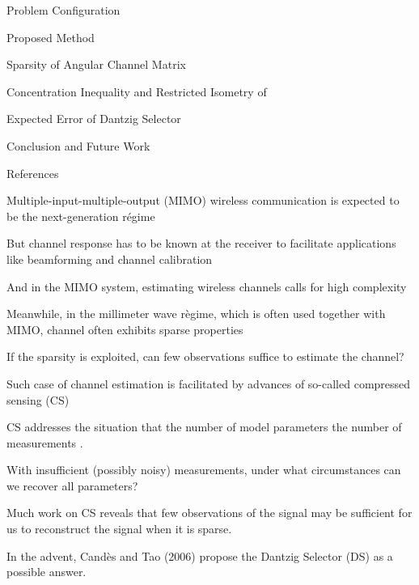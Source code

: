 

\blank [big]

\blank [big]


\page [yes]
{
\I Problem Configuration

\I Proposed Method

\I Sparsity of Angular Channel Matrix

\I Concentration Inequality and Restricted Isometry of 

\I Expected Error of Dantzig Selector

\I Conclusion and Future Work

\I References
}
{
\I Multiple-input-multiple-output (MIMO) wireless communication is expected to be the next-generation r\'egime

\I But channel response has to be known at the receiver to facilitate applications like beamforming and channel calibration

\I And in the MIMO system, estimating wireless channels calls for high complexity

\I Meanwhile, in the millimeter wave r\`egime, which is often used together with MIMO, channel often exhibits sparse properties

\I If the sparsity is exploited, can few observations suffice to estimate the channel?
}
{
\I Such case of channel estimation is facilitated by advances of so-called compressed sensing (CS)

\I CS addresses the situation that the number of model parameters  the number of measurements .

\I With insufficient (possibly noisy) measurements, under what circumstances can we recover all  parameters?

\I Much work on CS reveals that few observations of the signal may be sufficient for us to reconstruct the signal when it is sparse.

\I In the advent, Cand\`es and Tao (2006) propose the Dantzig Selector (DS) as a possible answer.
}
